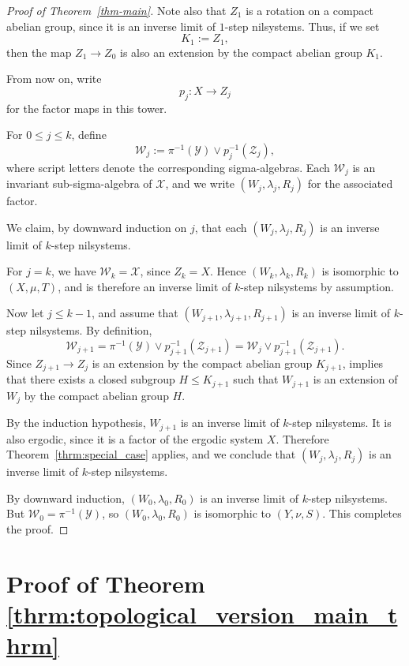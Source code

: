 \documentclass[12pt]{amsart}
\theoremstyle{plain}
\theoremstyle{definition}
\begin{document}
\begin{proof}[Proof of Theorem~\ref{thm-main}]
    Note also that $Z_1$ is a rotation on a compact abelian group, since it is an inverse limit of $1$-step nilsystems.
    Thus, if we set
    \[
    K_1:=Z_1,
    \]
    then the map $Z_1\to Z_0$ is also an extension by the compact abelian group $K_1$.

    From now on, write
    \[
    p_j\colon X\to Z_j
    \]
    for the factor maps in this tower.

    For $0\leq j\leq k$, define
    \[
    \mathcal W_j:=\pi^{-1}(\mathcal Y)\vee p_j^{-1}(\mathcal Z_j),
    \]
    where script letters denote the corresponding sigma-algebras.
    Each $\mathcal W_j$ is an invariant sub-sigma-algebra of $\mathcal X$, and we write $(W_j,\lambda_j,R_j)$ 
    for the associated factor.

    We claim, by downward induction on $j$, that each $(W_j,\lambda_j,R_j)$ is an inverse limit of $k$-step nilsystems.

    For $j=k$, we have $\mathcal W_k=\mathcal X$, since $Z_k=X$.
    Hence $(W_k,\lambda_k,R_k)$ is isomorphic to $(X,\mu,T)$, and is therefore an inverse limit of $k$-step nilsystems by assumption.

    Now let $j\leq k-1$, and assume that $(W_{j+1},\lambda_{j+1},R_{j+1})$ is an inverse limit of $k$-step nilsystems.
    By definition,
    \[
    \mathcal W_{j+1}
    = \pi^{-1}(\mathcal Y)\vee p_{j+1}^{-1}(\mathcal Z_{j+1})
    = \mathcal W_j \vee p_{j+1}^{-1}(\mathcal Z_{j+1}).
    \]
    Since $Z_{j+1}\to Z_j$ is an extension by the compact abelian group $K_{j+1}$, \cite[Chapter~5, Lemma~18]{hk-book} implies that there exists a closed subgroup $H\leq K_{j+1}$ 
    such that $W_{j+1}$ is an extension of $W_j$ by the compact abelian group $H$.

    By the induction hypothesis, $W_{j+1}$ is an inverse limit of $k$-step nilsystems.
    It is also ergodic, since it is a factor of the ergodic system $X$.
    Therefore Theorem~\ref{thrm:special_case} applies, and we conclude that $(W_j,\lambda_j,R_j)$ is an inverse limit of $k$-step nilsystems.

    By downward induction, $(W_0,\lambda_0,R_0)$ is an inverse limit of $k$-step nilsystems.
    But $\mathcal W_0=\pi^{-1}(\mathcal Y)$,     so $(W_0,\lambda_0,R_0)$ is isomorphic to $(Y,\nu,S)$.
    This completes the proof.
\end{proof}

\section{Proof of Theorem \ref{thrm:topological_version_main_thrm}}\label{sec:topological}
\end{document}
